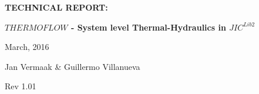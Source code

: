 \documentclass[11pt,letterpaper,titlepage]{article}
\begin{document}
\newcommand{\NSCDOCNUMBR}{NSC-REP-15-X}         %
\newcommand{\NSCDOCSUBJT}{TECHNICAL REPORT: }   %
\newcommand{\NSCDOCTITLE}{$THERMOFLOW$ - System level Thermal-Hydraulics in $JIC^{Lib2}$}       %
\newcommand{\NSCDOCDATE} {March, 2016}    %
\newcommand{\NSCDOCREV}  {Rev 1.01} %



\begin{titlepage}
	\pagestyle{fancy}
	\vspace*{1.0cm}
	\centering
	\vspace{1cm}
	\vspace{.25cm}
	{\Large\bfseries  \NSCDOCSUBJT \par} 
	{\Large\bfseries \NSCDOCTITLE  \par}
	\vspace{1cm}
	{\Large \NSCDOCDATE \par}
	\vspace{1.0cm}
	{\Large Jan Vermaak \& Guillermo Villanueva \par}
	{\Large \NSCDOCREV \par}
		

	\begin{center}
		\begin{minipage}[c]{0.45\textwidth}
			\begin{figure}[H]
			

\end{figure}
\end{minipage}
\end{center}
\end{titlepage}
\end{document}
